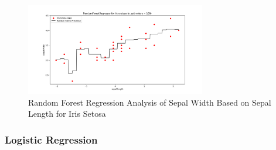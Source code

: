 \documentclass[a4paper]{article}
\begin{document}
\begin{enumerate}
\begin{figure}[h]
	\centering
	\includegraphics[width=0.7\textwidth]{picture/RF5}
	\caption{Random Forest Regression Analysis of Sepal Width Based on Sepal Length for Iris Setosa}
	\label{fig:iris_setosa_regression}
\end{figure}
\end{enumerate}
\newpage
\subsubsection{Logistic Regression}
\end{document}
